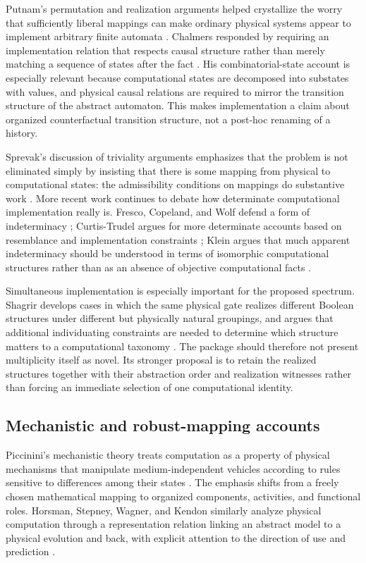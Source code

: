 \documentclass[11pt,a4paper]{article}
\begin{document}
Putnam's permutation and realization arguments helped crystallize the worry that sufficiently liberal mappings can make ordinary physical systems appear to implement arbitrary finite automata \cite{Putnam1988}. Chalmers responded by requiring an implementation relation that respects causal structure rather than merely matching a sequence of states after the fact \cite{Chalmers1994,Chalmers1996}. His combinatorial-state account is especially relevant because computational states are decomposed into substates with values, and physical causal relations are required to mirror the transition structure of the abstract automaton. This makes implementation a claim about organized counterfactual transition structure, not a post-hoc renaming of a history.

Sprevak's discussion of triviality arguments emphasizes that the problem is not eliminated simply by insisting that there is some mapping from physical to computational states: the admissibility conditions on mappings do substantive work \cite{Sprevak2012,Sprevak2018}. More recent work continues to debate how determinate computational implementation really is. Fresco, Copeland, and Wolf defend a form of indeterminacy \cite{Fresco2021}; Curtis-Trudel argues for more determinate accounts based on resemblance and implementation constraints \cite{CurtisTrudel2021,CurtisTrudel2022}; Klein argues that much apparent indeterminacy should be understood in terms of isomorphic computational structures rather than as an absence of objective computational facts \cite{Klein2026}.

Simultaneous implementation is especially important for the proposed spectrum. Shagrir develops cases in which the same physical gate realizes different Boolean structures under different but physically natural groupings, and argues that additional individuating constraints are needed to determine which structure matters to a computational taxonomy \cite{Shagrir2022}. The package should therefore not present multiplicity itself as novel. Its stronger proposal is to retain the realized structures together with their abstraction order and realization witnesses rather than forcing an immediate selection of one computational identity.

\subsection{Mechanistic and robust-mapping accounts}

Piccinini's mechanistic theory treats computation as a property of physical mechanisms that manipulate medium-independent vehicles according to rules sensitive to differences among their states \cite{Piccinini2015}. The emphasis shifts from a freely chosen mathematical mapping to organized components, activities, and functional roles. Horsman, Stepney, Wagner, and Kendon similarly analyze physical computation through a representation relation linking an abstract model to a physical evolution and back, with explicit attention to the direction of use and prediction \cite{Horsman2014}.
\end{document}
